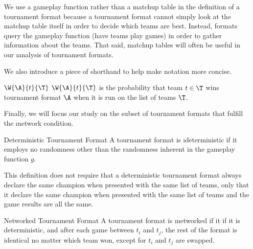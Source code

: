 {    We use a gameplay function rather than a matchup table in the definition of a tournament format because a tournament format cannot simply look at the matchup table itself in order to decide which teams are best. Instead, formats query the gameplay function (have teams play games) in order to gather information about the teams. That said, matchup tables will often be useful in our \i{analysis} of tournament formats. 

    We also introduce a piece of shorthand to help make notation more concise.

    \begin{definition}{$\W{\A}{t}{\T}$}{}
        $\W{\A}{t}{\T}$ is the probability that team $t \in \T$ wins tournament format $\A$ when it is run on the list of teams $\T$.
    \end{definition}

    Finally, we will focus our study on the subset of tournament formats that fulfill the \i{network condition}.

    \begin{definition}{Deterministic Tournament Format}{}
        A tournament format is \i{deterministic} if it employs no randomness other than the randomness inherent in the gameplay function $g$.
    \end{definition}

    This definition does not require that a deterministic tournament format always declare the same champion when presented with the same list of teams, only that it declare the same champion when presented with the same list of teams and the game results are all the same.

    \begin{definition}{Networked Tournament Format}{}{}
        A tournament format is \i{networked} if it  if it is deterministic, and after each game between $t_i$ and $t_j$, the rest of the format is identical no matter which team won, except for $t_i$ and $t_j$ are swapped.
    \end{definition}
}
